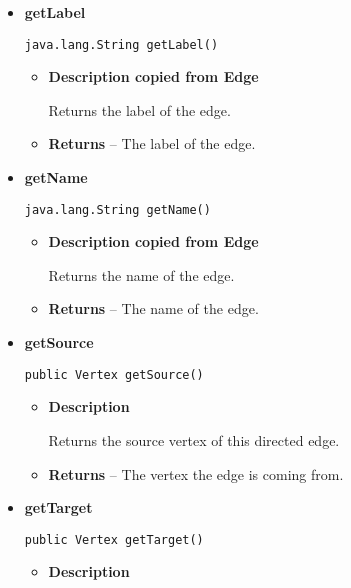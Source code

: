 {{{{{{{{{{{{{{{{{\begin{itemize}
{\begin{itemize}
{Returns the ID of the edge.
}
\item{{\bf  Returns} -- 
The id of the edge. 
}%
\end{itemize}
}%
\item{ 
{\bf  getLabel}\\
\begin{lstlisting}[frame=none]
java.lang.String getLabel()\end{lstlisting} %
\begin{itemize}
\item{
{\bf  Description copied from Edge{\small {}} }

Returns the label of the edge.
}
\item{{\bf  Returns} -- 
The label of the edge. 
}%
\end{itemize}
}%
\item{ 
{\bf  getName}\\
\begin{lstlisting}[frame=none]
java.lang.String getName()\end{lstlisting} %
\begin{itemize}
\item{
{\bf  Description copied from Edge{\small {}} }

Returns the name of the edge.
}
\item{{\bf  Returns} -- 
The name of the edge. 
}%
\end{itemize}
}%
\item{ 
{\bf  getSource}\\
\begin{lstlisting}[frame=none]
public Vertex getSource()\end{lstlisting} %
\begin{itemize}
\item{
{\bf  Description}

Returns the source vertex of this directed edge.
}
\item{{\bf  Returns} -- 
The vertex the edge is coming from. 
}%
\end{itemize}
}%
\item{ 
{\bf  getTarget}\\
\begin{lstlisting}[frame=none]
public Vertex getTarget()\end{lstlisting} %
\begin{itemize}
\item{
{\bf  Description}

}
\end{itemize}}
\end{itemize}}}}}}}}}}}}}}}}}}
